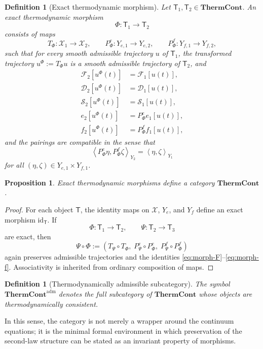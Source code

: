 \documentclass[11pt]{article}
\newtheorem{proposition}[theorem]{Proposition}
\newtheorem{definition}[theorem]{Definition}
\newcommand{\id}{\mathrm{id}}
\newcommand{\F}{\mathcal{F}}
\newcommand{\X}{\mathcal{X}}
\newcommand{\Diss}{\mathcal{D}}
\newcommand{\Src}{\mathcal{S}}
\newcommand{\ThermCont}{\mathbf{ThermCont}}
\newcommand{\ThermAdm}{\mathbf{ThermCont}^{\mathrm{adm}}}
\newcommand{\pair}[2]{\left\langle #1,#2\right\rangle}
\begin{document}
\begin{definition}[Exact thermodynamic morphism]\label{def:exact-morphism}
Let \(\mathsf{T}_1,\mathsf{T}_2\in\ThermCont\). An \emph{exact thermodynamic morphism}
\[
\Phi:\mathsf{T}_1\to \mathsf{T}_2
\]
consists of maps
\[
T_\Phi:\X_1\to \X_2,
\qquad
P^e_\Phi:Y_{e,1}\to Y_{e,2},
\qquad
P^f_\Phi:Y_{f,1}\to Y_{f,2},
\]
such that for every smooth admissible trajectory \(u\) of \(\mathsf{T}_1\), the
transformed trajectory \(u^\Phi:=T_\Phi u\) is a smooth admissible trajectory of
\(\mathsf{T}_2\), and
\begin{align}
\F_2[u^\Phi(t)]&=\F_1[u(t)],\label{eq:morph-F}\\
\Diss_2[u^\Phi(t)]&=\Diss_1[u(t)],\label{eq:morph-D}\\
\Src_2[u^\Phi(t)]&=\Src_1[u(t)],\label{eq:morph-S}\\
e_2[u^\Phi(t)]&=P^e_\Phi e_1[u(t)],\label{eq:morph-e}\\
f_2[u^\Phi(t)]&=P^f_\Phi f_1[u(t)],\label{eq:morph-f}
\end{align}
and the pairings are compatible in the sense that
\[
\pair{P^e_\Phi \eta}{P^f_\Phi \zeta}_{Y_2}
=
\pair{\eta}{\zeta}_{Y_1}
\]
for all \((\eta,\zeta)\in Y_{e,1}\times Y_{f,1}\).
\end{definition}

\begin{proposition}\label{prop:category}
Exact thermodynamic morphisms define a category \(\ThermCont\).
\end{proposition}

\begin{proof}
For each object \(\mathsf{T}\), the identity maps on \(\X\), \(Y_e\), and \(Y_f\)
define an exact morphism \(\id_\mathsf{T}\). If
\[
\Phi:\mathsf{T}_1\to \mathsf{T}_2,
\qquad
\Psi:\mathsf{T}_2\to \mathsf{T}_3
\]
are exact, then
\[
\Psi\circ\Phi
:=
(T_\Psi\circ T_\Phi,\; P^e_\Psi\circ P^e_\Phi,\; P^f_\Psi\circ P^f_\Phi)
\]
again preserves admissible trajectories and the identities
\eqref{eq:morph-F}--\eqref{eq:morph-f}. Associativity is inherited from ordinary
composition of maps.
\end{proof}

\begin{definition}[Thermodynamically admissible subcategory]
The symbol \(\ThermAdm\) denotes the full subcategory of \(\ThermCont\) whose objects
are thermodynamically consistent.
\end{definition}

In this sense, the category is not merely a wrapper around the continuum equations;
it is the minimal formal environment in which preservation of the second-law
structure can be stated as an invariant property of morphisms.
\end{document}
